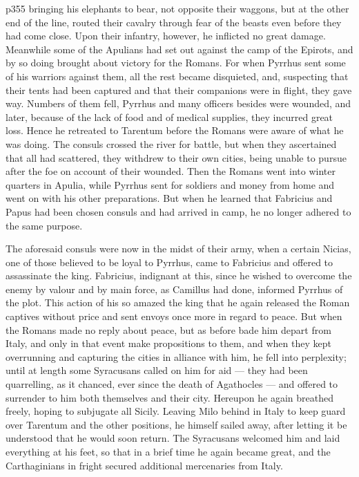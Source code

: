 p355 bringing his elephants to bear, not opposite their waggons, but at the other end of the line, routed their cavalry through fear of the beasts even before they had come close. Upon their infantry, however, he inflicted no great damage. Meanwhile some of the Apulians had set out against the camp of the Epirots, and by so doing brought about victory for the Romans. For when Pyrrhus sent some of his warriors against them, all the rest became disquieted, and, suspecting that their tents had been captured and that their companions were in flight, they gave way. Numbers of them fell, Pyrrhus and many officers besides were wounded, and later, because of the lack of food and of medical supplies, they incurred great loss. Hence he retreated to Tarentum before the Romans were aware of what he was doing. The consuls crossed the river for battle, but when they ascertained that all had scattered, they withdrew to their own cities, being unable to pursue after the foe on account of their wounded. Then the Romans went into winter quarters in Apulia, while Pyrrhus sent for soldiers and money from home and went on with his other preparations. But when he learned that Fabricius and Papus had been chosen consuls and had arrived in camp, he no longer adhered to the same purpose.

The aforesaid consuls were now in the midst of their army, when a certain Nicias, one of those believed to be loyal to Pyrrhus, came to Fabricius and offered to assassinate the king. Fabricius, indignant at this, since he wished to overcome the enemy by valour and by main force, as Camillus had done, informed Pyrrhus of the plot. This action of his so amazed the king that he again released the Roman captives without price and sent envoys once more in regard to peace. But when the Romans made no reply about peace, but as before bade him depart from Italy, and only in that event make propositions to them, and when they kept overrunning and capturing the cities in alliance with him, he fell into perplexity; until at length some Syracusans called on him for aid \texthebrew{—} they had been quarrelling, as it chanced, ever since the death of Agathocles \texthebrew{—} and offered to surrender to him both themselves and their city. Hereupon he again breathed freely, hoping to subjugate all Sicily. Leaving Milo behind in Italy to keep guard over Tarentum and the other positions, he himself sailed away, after letting it be understood that he would soon return. The Syracusans welcomed him and laid everything at his feet, so that in a brief time he again became great, and the Carthaginians in fright secured additional mercenaries from Italy.

